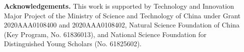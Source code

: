 \documentclass[sigconf]{acmart}
\newcommand{\vpara}[1]{\vspace{0.04in}\noindent\textbf{#1}\xspace}
\begin{document}


\maketitle

\renewcommand{\thefootnote}{\fnsymbol{footnote}}
\renewcommand{\thefootnote}{\arabic{footnote}}




%



\vpara{Acknowledgements.} This work is supported by Technology and Innovation Major Project of the Ministry of Science and Technology of China under Grant 2020AAA0108400 and 2020AAA0108402, Natural Science
Foundation of China (Key Program, No. 61836013), and National Science
Foundation for Distinguished Young Scholars (No. 61825602). 


\balance





\clearpage
\appendix

\end{document}
